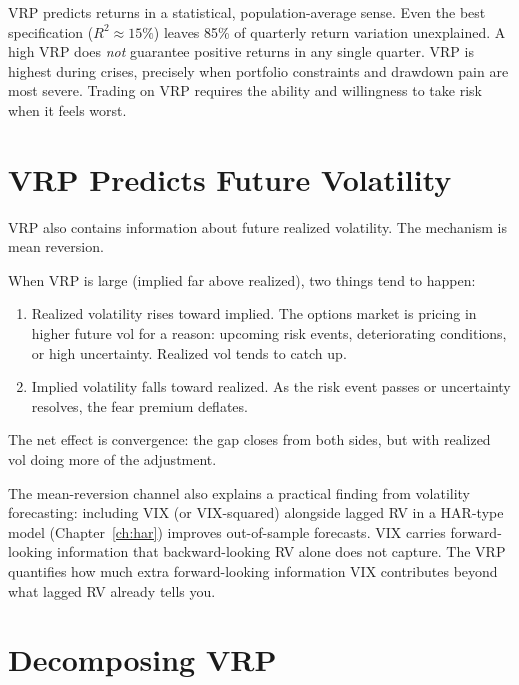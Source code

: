 \begin{warning}
VRP predicts returns in a statistical, population-average sense.
Even the best specification ($R^2 \approx 15\%$) leaves 85\% of quarterly return variation unexplained.
A high VRP does \emph{not} guarantee positive returns in any single quarter.
VRP is highest during crises, precisely when portfolio constraints and drawdown pain are most severe.
Trading on VRP requires the ability and willingness to take risk when it feels worst.
\end{warning}


\section{VRP Predicts Future Volatility}
\label{sec:vrp-vol-forecasting}

VRP also contains information about future realized volatility.
The mechanism is mean reversion.

When VRP is large (implied far above realized), two things tend to happen:
\begin{enumerate}[nosep]
  \item Realized volatility rises toward implied. The options market is pricing in higher future vol for a reason: upcoming risk events, deteriorating conditions, or high uncertainty. Realized vol tends to catch up.
  \item Implied volatility falls toward realized. As the risk event passes or uncertainty resolves, the fear premium deflates.
\end{enumerate}

The net effect is convergence: the gap closes from both sides, but with realized vol doing more of the adjustment.

The mean-reversion channel also explains a practical finding from volatility forecasting: including VIX (or VIX-squared) alongside lagged RV in a HAR-type model (Chapter~\ref{ch:har}) improves out-of-sample forecasts.
VIX carries forward-looking information that backward-looking RV alone does not capture.
The VRP quantifies how much extra forward-looking information VIX contributes beyond what lagged RV already tells you.


\section{Decomposing VRP}
\label{sec:vrp-decomposition}

